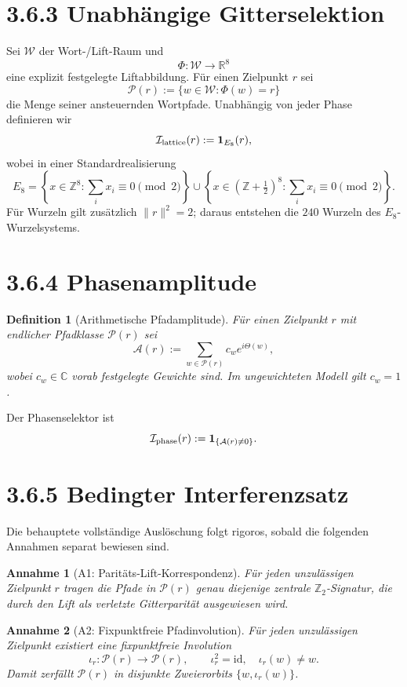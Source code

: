 \documentclass[11pt,a4paper]{article}
\newtheorem{definition}{Definition}
\newtheorem{annahme}{Annahme}
\begin{document}
\section*{3.6.3 Unabhängige Gitterselektion}
Sei $\mathcal W$ der Wort-/Lift-Raum und
\[
\Phi:\mathcal W\longrightarrow \mathbb R^8
\]
eine explizit festgelegte Liftabbildung. Für einen Zielpunkt $r$ sei
\[
\mathcal P(r):=\{w\in\mathcal W:\Phi(w)=r\}
\]
die Menge seiner ansteuernden Wortpfade. Unabhängig von jeder Phase definieren wir
\[
\mathcal I_{\rm lattice}(r):=\mathbf 1_{E_8}(r),
\]
wobei in einer Standardrealisierung
\[
E_8=\left\{x\in\mathbb Z^8:\sum_i x_i\equiv0\pmod2\right\}
\cup
\left\{x\in\left(\mathbb Z+\tfrac12\right)^8:\sum_i x_i\equiv0\pmod2\right\}.
\]
Für Wurzeln gilt zusätzlich $\|r\|^2=2$; daraus entstehen die $240$ Wurzeln des $E_8$-Wurzelsystems.

\section*{3.6.4 Phasenamplitude}
\begin{definition}[Arithmetische Pfadamplitude]
Für einen Zielpunkt $r$ mit endlicher Pfadklasse $\mathcal P(r)$ sei
\[
\mathcal A(r):=\sum_{w\in\mathcal P(r)} c_w e^{i\Theta(w)},
\]
wobei $c_w\in\mathbb C$ vorab festgelegte Gewichte sind. Im ungewichteten Modell gilt $c_w=1$.
\end{definition}
Der Phasenselektor ist
\[
\mathcal I_{\rm phase}(r):=\mathbf 1_{\{\mathcal A(r)\neq0\}}.
\]

\section*{3.6.5 Bedingter Interferenzsatz}
Die behauptete vollständige Auslöschung folgt rigoros, sobald die folgenden Annahmen separat bewiesen sind.

\begin{annahme}[A1: Paritäts-Lift-Korrespondenz]
Für jeden unzulässigen Zielpunkt $r$ tragen die Pfade in $\mathcal P(r)$ genau diejenige zentrale $\mathbb Z_2$-Signatur, die durch den Lift als verletzte Gitterparität ausgewiesen wird.
\end{annahme}

\begin{annahme}[A2: Fixpunktfreie Pfadinvolution]
Für jeden unzulässigen Zielpunkt existiert eine fixpunktfreie Involution
\[
\iota_r:\mathcal P(r)\to\mathcal P(r),\qquad \iota_r^2=\mathrm{id},\quad \iota_r(w)\neq w.
\]
Damit zerfällt $\mathcal P(r)$ in disjunkte Zweierorbits $\{w,\iota_r(w)\}$.
\end{annahme}
\end{document}
